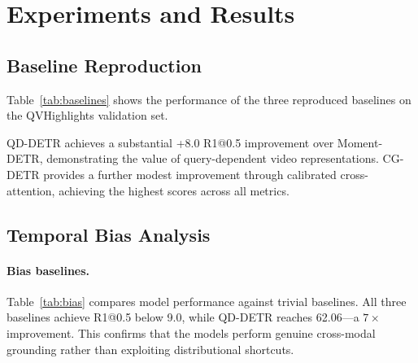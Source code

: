 \documentclass[10pt,twocolumn]{article}
\begin{document}
\section{Experiments and Results}
\label{sec:results}

\subsection{Baseline Reproduction}
\label{sec:baseline_results}

Table~\ref{tab:baselines} shows the performance of the three reproduced baselines on the QVHighlights validation set.

\begin{table}[t]
\centering
\caption{Baseline performance on QVHighlights validation set. All models use CLIP+SlowFast visual features.}
\label{tab:baselines}
\small
{}
\vspace{-6pt}
\end{table}

QD-DETR achieves a substantial +8.0 R1@0.5 improvement over Moment-DETR, demonstrating the value of query-dependent video representations. CG-DETR provides a further modest improvement through calibrated cross-attention, achieving the highest scores across all metrics.

\subsection{Temporal Bias Analysis}
\label{sec:bias_results}

\paragraph{Bias baselines.}
Table~\ref{tab:bias} compares model performance against trivial baselines. All three baselines achieve R1@0.5 below 9.0, while QD-DETR reaches 62.06---a $7\times$ improvement. This confirms that the models perform genuine cross-modal grounding rather than exploiting distributional shortcuts.
\end{document}
